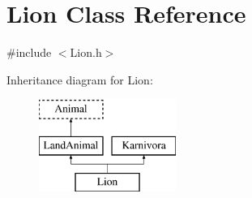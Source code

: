 \hypertarget{classLion}{\section{Lion Class Reference}
\label{classLion}
}


{\ttfamily \#include $<$Lion.\-h$>$}

Inheritance diagram for Lion\-:\begin{figure}[H]
\begin{center}
\leavevmode
\includegraphics[height=3.000000cm]{classLion}
\end{center}
\end{figure}
